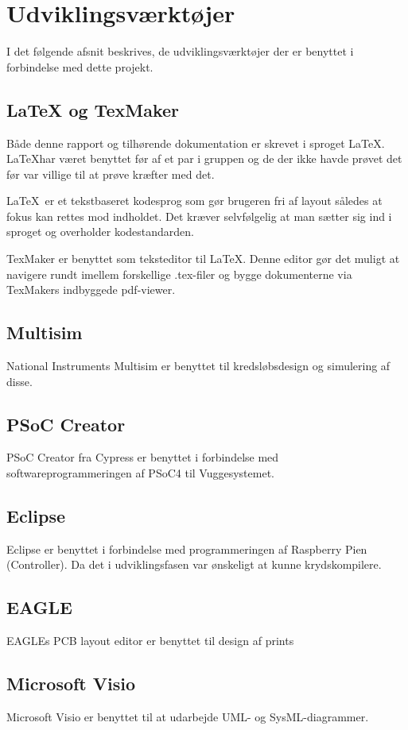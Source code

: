 \chapter{Udviklingsværktøjer}
I det følgende afsnit beskrives, de  udviklingsværktøjer der er benyttet i forbindelse med dette projekt. 

\section*{LaTeX og TexMaker}
Både denne rapport og tilhørende dokumentation er skrevet i sproget \LaTeX. \LaTeX har været benyttet før af et par i gruppen og de der ikke havde prøvet det før var villige til at prøve kræfter med det.

\LaTeX \ er et tekstbaseret kodesprog som gør brugeren fri af layout således at fokus kan rettes mod indholdet. Det kræver selvfølgelig at man sætter sig ind i sproget og overholder kodestandarden. 

TexMaker er benyttet som teksteditor til \LaTeX. Denne editor gør det muligt at navigere rundt imellem forskellige .tex-filer og bygge dokumenterne via TexMakers indbyggede pdf-viewer.

\section*{Multisim}
National Instruments Multisim er benyttet til kredsløbsdesign og simulering af disse. 

\section*{PSoC Creator}
PSoC Creator fra Cypress er benyttet i forbindelse med softwareprogrammeringen af PSoC4 til Vuggesystemet. 

\section*{Eclipse}
Eclipse er benyttet i forbindelse med programmeringen af Raspberry Pien (Controller). Da det i udviklingsfasen var ønskeligt at kunne krydskompilere. 

\section*{EAGLE}
EAGLEs PCB layout editor er benyttet til design af prints

\section*{Microsoft Visio}
Microsoft Visio er benyttet til at udarbejde UML- og SysML-diagrammer. 

